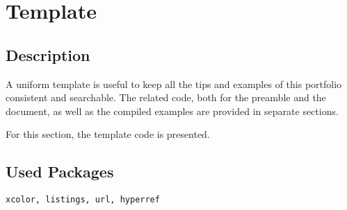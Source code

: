 \documentclass{article}
\begin{document}
	
	\section*{Template}
	
	\subsection*{Description}
	A uniform template is useful to keep all the tips and examples of this portfolio consistent and searchable. The related code, both for the preamble and the document, as well as the compiled examples are provided in separate sections.
	
	For this section, the template code is presented.
		
	\subsection*{Used Packages}
	\verb|xcolor, listings, url, hyperref|
	
\end{document}

